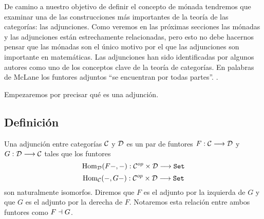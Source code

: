 De camino a nuestro objetivo de definir el concepto de mónada
tendremos que examinar una de las construcciones más importantes
de la teoría de las categorías: las adjunciones.
Como veremos en las próximas
secciones las mónadas y las adjunciones están estrechamente relacionadas,
pero esto no debe hacernos pensar que las mónadas son el único motivo
por el que las adjunciones son importante en matemáticas. Las adjunciones
han sido identificadas por algunos autores como uno de los conceptos
clave de la teoría de categorías. En palabras
de McLane los funtores adjuntos ``se encuentran por todas partes''.
\cite{ariseeverywhere}.

Empezaremos por precisar qué es una adjunción.
\subsection{Definición}
\begin{definition}
  Una adjunción entre categorías $\mathcal{C}$ y $\mathcal{D}$ es un par de funtores
  $F : \mathcal{C}\longrightarrow \mathcal{D}$ y $G: \mathcal{D}\longrightarrow \mathcal{C}$ tales que los funtores
  $$\operatorname{Hom}_{\mathcal{D}}(F-, -) : \mathcal{C}^{op}\times\mathcal{D}\longrightarrow \texttt{Set}$$
  $$\operatorname{Hom}_{\mathcal{C}}(-, G-) : \mathcal{C}^{op}\times\mathcal{D}\longrightarrow \texttt{Set}$$
  son naturalmente isomorfos.
  Diremos que $F$ es el
  adjunto por la izquierda de $G$ y que $G$ es el adjunto
  por la derecha de $F$. Notaremos esta relación entre ambos funtores
  como $F \dashv G$.
\end{definition}


